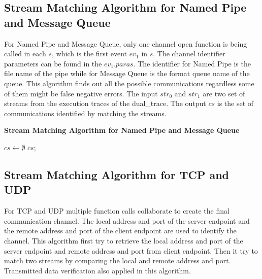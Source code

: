 \subsection{Stream Matching Algorithm for Named Pipe and Message Queue}
For Named Pipe and Message Queue, only one channel open function is being called in each $s$, which is the first event $ev_1$ in $s$. The channel identifier parameters can be found in the $ev_1.paras$. The identifier for Named Pipe is the file name of the pipe while for Message Queue is the format queue name of the queue. This algorithm finds out all the possible communications regardless some of them might be false negative errors. The input $str_0$ and $str_1$ are two set of streams from the execution traces of the dual\_trace. The output $cs$ is the set of communications identified by matching the streams.

\begin{algorithm}[H]
\DontPrintSemicolon
\caption{{\bf Stream Matching Algorithm for Named Pipe and Message Queue} \label{matchAlg1}}
$cs \leftarrow \emptyset$\; 
\KwRet $cs$;\;
\end{algorithm} 


\subsection{Stream Matching Algorithm for TCP and UDP}
For TCP and UDP multiple function calls collaborate to create the final communication channel. The local address and port of the server endpoint and the remote address and port of the client endpoint are used to identify the channel. This algorithm first try to retrieve the local address and port of the server endpoint and remote address and port from client endpoint. Then it try to match two streams by comparing the local and remote address and port. Transmitted data verification also applied in this algorithm.

